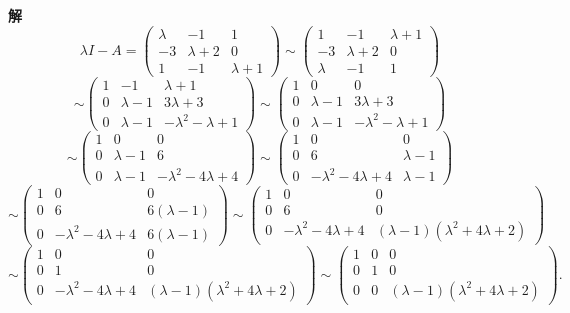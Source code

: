 \documentclass[UTF8,12pt,a4paper,fontset=fandol]{ctexart}
\begin{document}
\noindent\textbf{解}\quad
\[
\lambda I-A=
\left(\begin{array}{ccc}
\lambda & -1 & 1\\
-3 & \lambda+2 & 0\\
1 & -1 & \lambda+1
\end{array}\right)
\sim
\left(\begin{array}{ccc}
1 & -1 & \lambda+1\\
-3 & \lambda+2 & 0\\
\lambda & -1 & 1
\end{array}\right)
\]
\[
\sim
\left(\begin{array}{ccc}
1 & -1 & \lambda+1\\
0 & \lambda-1 & 3\lambda+3\\
0 & \lambda-1 & -\lambda^2-\lambda+1
\end{array}\right)
\sim
\left(\begin{array}{ccc}
1 & 0 & 0\\
0 & \lambda-1 & 3\lambda+3\\
0 & \lambda-1 & -\lambda^2-\lambda+1
\end{array}\right)
\]
\[
\sim
\left(\begin{array}{ccc}
1 & 0 & 0\\
0 & \lambda-1 & 6\\
0 & \lambda-1 & -\lambda^2-4\lambda+4
\end{array}\right)
\sim
\left(\begin{array}{ccc}
1 & 0 & 0\\
0 & 6 & \lambda-1\\
0 & -\lambda^2-4\lambda+4 & \lambda-1
\end{array}\right)
\]
\[
\sim
\left(\begin{array}{ccc}
1 & 0 & 0\\
0 & 6 & 6(\lambda-1)\\
0 & -\lambda^2-4\lambda+4 & 6(\lambda-1)
\end{array}\right)
\sim
\left(\begin{array}{ccc}
1 & 0 & 0\\
0 & 6 & 0\\
0 & -\lambda^2-4\lambda+4 & (\lambda-1)(\lambda^2+4\lambda+2)
\end{array}\right)
\]
\[
\sim
\left(\begin{array}{ccc}
1 & 0 & 0\\
0 & 1 & 0\\
0 & -\lambda^2-4\lambda+4 & (\lambda-1)(\lambda^2+4\lambda+2)
\end{array}\right)
\sim
\left(\begin{array}{ccc}
1 & 0 & 0\\
0 & 1 & 0\\
0 & 0 & (\lambda-1)(\lambda^2+4\lambda+2)
\end{array}\right).
\]
\end{document}
